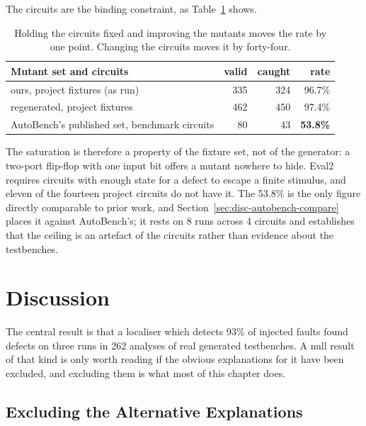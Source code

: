 \documentclass[11pt,a4paper,titlepage=false]{scrreprt}
\begin{document}
The circuits are the binding constraint, as Table~\ref{tab:eval2-compare} shows.

\begin{table}[H]
\centering
\small
\begin{tabular}{@{}l r r r@{}}
\toprule
\textbf{Mutant set and circuits} & \textbf{valid} & \textbf{caught} & \textbf{rate} \\
\midrule
ours, project fixtures (as run)              & 335 & 324 & 96.7\% \\
regenerated, project fixtures                & 462 & 450 & 97.4\% \\
AutoBench's published set, benchmark circuits & 80 & 43 & \textbf{53.8\%} \\
\bottomrule
\end{tabular}
\caption{Holding the circuits fixed and improving the mutants moves the rate by one point.
Changing the circuits moves it by forty-four.}
\label{tab:eval2-compare}
\end{table}

The saturation is therefore a property of the fixture set, not of the generator: a two-port
flip-flop with one input bit offers a mutant nowhere to hide. Eval2 requires circuits with
enough state for a defect to escape a finite stimulus, and eleven of the fourteen project
circuits do not have it. The 53.8\% is the only figure directly comparable to prior work, and
Section~\ref{sec:disc-autobench-compare} places it against AutoBench's; it rests on 8 runs
across 4 circuits and establishes that the ceiling is an artefact of the circuits rather than
evidence about the testbenches.

\chapter{Discussion}\label{ch:discussion}

The central result is that a localiser which detects 93\% of injected faults found defects
on three runs in 262 analyses of real generated testbenches. A null result of that kind is only
worth reading if the obvious explanations for it have been excluded, and excluding them is
what most of this chapter does.

\section{Excluding the Alternative Explanations}\label{sec:disc-alternatives}
\end{document}
